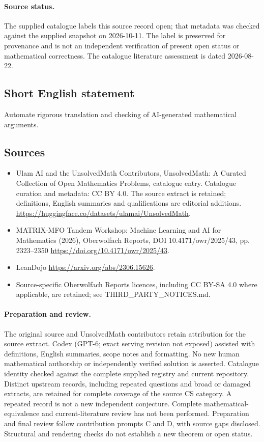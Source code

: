 \documentclass[11pt]{article}
\begin{document}
\paragraph{Source status.}
The supplied catalogue labels this source record open; that metadata was checked against the supplied snapshot on 2026-10-11. The label is preserved for provenance and is not an independent verification of present open status or mathematical correctness. The catalogue literature assessment is dated 2026-08-22.
\subsection{Short English statement}
Automate rigorous translation and checking of AI-generated mathematical arguments.
\subsection{Sources}
\begin{itemize}
\item[S1] Ulam AI and the UnsolvedMath Contributors, UnsolvedMath: A Curated Collection of Open Mathematics Problems, catalogue entry. Catalogue curation and metadata: CC BY 4.0. The source extract is retained; definitions, English summaries and qualifications are editorial additions.
\url{https://huggingface.co/datasets/ulamai/UnsolvedMath}.
\item[S2] MATRIX-MFO Tandem Workshop: Machine Learning and AI for Mathematics (2026), Oberwolfach Reports, DOI 10.4171/owr/2025/43, pp. 2323--2350
\url{https://doi.org/10.4171/owr/2025/43}.
\item[S3] LeanDojo
\url{https://arxiv.org/abs/2306.15626}.
\item Source-specific Oberwolfach Reports licences, including CC BY-SA 4.0 where applicable, are retained; see THIRD\_PARTY\_NOTICES.md.
\end{itemize}
\paragraph{Preparation and review.}
The original source and UnsolvedMath contributors retain attribution for the source extract. Codex (GPT-6; exact serving revision not exposed) assisted with definitions, English summaries, scope notes and formatting. No new human mathematical authorship or independently verified solution is asserted. Catalogue identity checked against the complete supplied registry and current repository. Distinct upstream records, including repeated questions and broad or damaged extracts, are retained for complete coverage of the source CS category. A repeated record is not a new independent conjecture. Complete mathematical-equivalence and current-literature review has not been performed. Preparation and final review follow contribution prompts C and D, with source gaps disclosed. Structural and rendering checks do not establish a new theorem or open status.
\label{end:statement}
\end{document}
